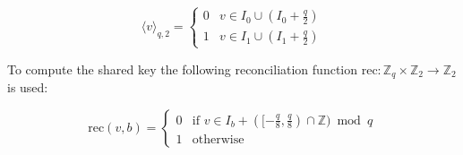 




\[
\langle v \rangle_{q, 2}=  
\begin{cases}
    0 & v \in I_{0} \cup (I_{0} + \frac{q}{2}) \\
    1 & v \in I_{1} \cup (I_{1} + \frac{q}{2})
\end{cases}
\]


To compute the shared key the following reconciliation function $\text{rec}: \mathbb{Z}_{q} \times \mathbb{Z}_{2} \to \mathbb{Z}_{2}$ is used:

\[
\text{rec}(v, b) =
\begin{cases}
    0 & \text{if } v \in I_{b} + ([-\frac{q}{8}, \frac{q}{8}) \cap \mathbb{Z}) \bmod q\\
    1 & \text{otherwise}
\end{cases}
\]


